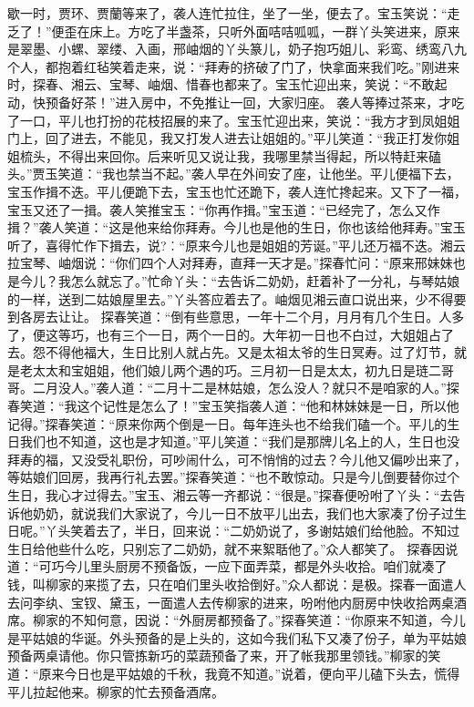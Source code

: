 \documentclass[12pt,oneside]{book}
\begin{document}
歇一时，贾环、贾蘭等来了，袭人连忙拉住，坐了一坐，便去了。宝玉笑说：“走乏了！”便歪在床上。方吃了半盏茶，只听外面咭咭呱呱，一群丫头笑进来，原来是翠墨、小螺、翠缕、入画，邢岫烟的丫头篆儿，奶子抱巧姐儿、彩鸾、绣鸾八九个人，都抱着红毡笑着走来，说：“拜寿的挤破了门了，快拿面来我们吃。”刚进来时，探春、湘云、宝琴、岫烟、惜春也都来了。宝玉忙迎出来，笑说：“不敢起动，快预备好茶！”进入房中，不免推让一回，大家归座。
袭人等捧过茶来，才吃了一口，平儿也打扮的花枝招展的来了。宝玉忙迎出来，笑说：“我方才到凤姐姐门上，回了进去，不能见，我又打发人进去让姐姐的。”平儿笑道：“我正打发你姐姐梳头，不得出来回你。后来听见又说让我，我哪里禁当得起，所以特赶来磕头。”贾玉笑道：“我也禁当不起。”袭人早在外间安了座，让他坐。平儿便福下去，宝玉作揖不迭。平儿便跪下去，宝玉也忙还跪下，袭人连忙搀起来。又下了一福，宝玉又还了一揖。袭人笑推宝玉：“你再作揖。”宝玉道：“已经完了，怎么又作揖？”袭人笑道：“这是他来给你拜寿。今儿也是他的生日，你也该给他拜寿。”宝玉听了，喜得忙作下揖去，说?︰“原来今儿也是姐姐的芳诞。”平儿还万福不迭。湘云拉宝琴、岫烟说：“你们四个人对拜寿，直拜一天才是。”探春忙问：“原来邢妹妹也是今儿？我怎么就忘了。”忙命丫头：“去告诉二奶奶，赶着补了一分礼，与琴姑娘的一样，送到二姑娘屋里去。”丫头答应着去了。岫烟见湘云直口说出来，少不得要到各房去让让。
探春笑道：“倒有些意思，一年十二个月，月月有几个生日。人多了，便这等巧，也有三个一日，两个一日的。大年初一日也不白过，大姐姐占了去。怨不得他福大，生日比别人就占先。又是太祖太爷的生日冥寿。过了灯节，就是老太太和宝姐姐，他们娘儿两个遇的巧。三月初一日是太太，初九日是琏二哥哥。二月没人。”袭人道：“二月十二是林姑娘，怎么没人？就只不是咱家的人。”探春笑道：“我这个记性是怎么了！”宝玉笑指袭人道：“他和林妹妹是一日，所以他记得。”探春笑道：“原来你两个倒是一日。每年连头也不给我们磕一个。平儿的生日我们也不知道，这也是才知道。”平儿笑道：“我们是那牌儿名上的人，生日也没拜寿的福，又没受礼职份，可吵闹什么，可不悄悄的过去？今儿他又偏吵出来了，等姑娘们回房，我再行礼去罢。”探春笑道：“也不敢惊动。只是今儿倒要替你过个生日，我心才过得去。”宝玉、湘云等一齐都说：“很是。”探春便吩咐了丫头：“去告诉他奶奶，就说我们大家说了，今儿一日不放平儿出去，我们也大家凑了份子过生日呢。”丫头笑着去了，半日，回来说：“二奶奶说了，多谢姑娘们给他脸。不知过生日给他些什么吃，只别忘了二奶奶，就不来絮聒他了。”众人都笑了。
探春因说道：“可巧今儿里头厨房不预备饭，一应下面弄菜，都是外头收拾。咱们就凑了钱，叫柳家的来揽了去，只在咱们里头收拾倒好。”众人都说：是极。探春一面遣人去问李纨、宝钗、黛玉，一面遣人去传柳家的进来，吩咐他内厨房中快收拾两桌酒席。柳家的不知何意，因说：“外厨房都预备了。”探春笑道：“你原来不知道，今儿是平姑娘的华诞。外头预备的是上头的，这如今我们私下又凑了份子，单为平姑娘预备两桌请他。你只管拣新巧的菜蔬预备了来，开了帐我那里领钱。”柳家的笑道：“原来今日也是平姑娘的千秋，我竟不知道。”说着，便向平儿磕下头去，慌得平儿拉起他来。柳家的忙去预备酒席。
\end{document}
